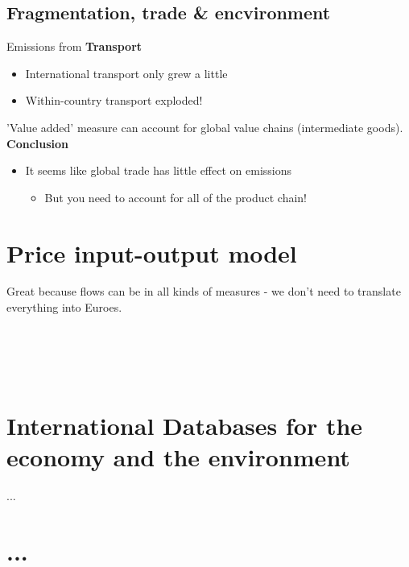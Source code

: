 \begin{multicols}{2}\noindent
\subsection{Fragmentation, trade \& encvironment}\noindent
Emissions from \textbf{Transport}
\begin{itemize}
  \item International transport only grew a little
  \item Within-country transport exploded!
\end{itemize}
'Value added' measure can account for global value chains (intermediate goods).\\
\textbf{Conclusion} \\
\begin{itemize}
  \item It seems like global trade has little effect on emissions
  \begin{itemize}
    \item But you need to account for all of the product chain!
  \end{itemize}
\end{itemize}

\end{multicols}

\section{Price input-output model} %
\begin{multicols}{2}\noindent
Great because flows can be in all kinds of measures - we don't need to translate everything into Euroes.\\ \\ \\ \\ \\


\end{multicols}
\section{International Databases for the economy and the environment} %
\begin{multicols}{2}
...


\end{multicols}


\section{...} %
\begin{multicols}{2}


\end{multicols}


